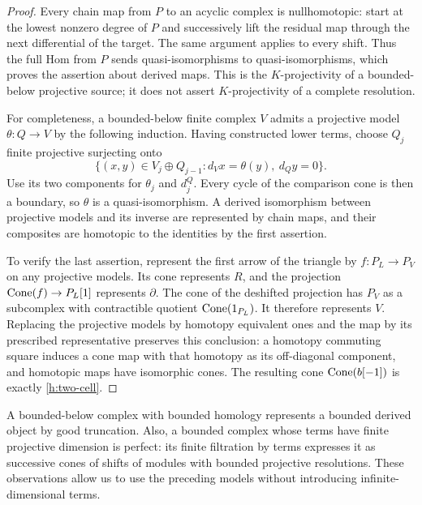 \begin{proof}
Every chain map from $P$ to an acyclic complex is nullhomotopic: start at
the lowest nonzero degree of $P$ and successively lift the residual map
through the next differential of the target. The same argument applies
to every shift. Thus the full Hom from $P$ sends quasi-isomorphisms to
quasi-isomorphisms, which proves the assertion about derived maps. This is
the $K$-projectivity of a bounded-below projective source; it does not assert
$K$-projectivity of a complete resolution.

For completeness, a bounded-below finite complex $V$ admits a projective
model $\theta:Q\to V$ by the following induction. Having constructed lower
terms, choose $Q_j$ finite projective surjecting onto
\[
 \{(x,y)\in V_j\oplus Q_{j-1}:d_Vx=\theta(y),\ d_Qy=0\}.
\]
Use its two components for $\theta_j$ and $d_j^Q$. Every cycle of the
comparison cone is then a boundary, so $\theta$ is a quasi-isomorphism.
A derived isomorphism between projective models and its inverse are
represented by chain maps, and their composites are homotopic to the
identities by the first assertion.

To verify the last assertion, represent the first arrow of the triangle
by $f:P_L\to P_V$ on any projective models. Its cone represents $R$, and
the projection $\operatorname{Cone}(f)\to P_L[1]$ represents $\partial$.
The cone of the deshifted projection has $P_V$ as a subcomplex with
contractible quotient $\operatorname{Cone}(1_{P_L})$. It therefore represents $V$.
Replacing the projective models by homotopy equivalent ones and the map
by its prescribed representative preserves this conclusion: a homotopy
commuting square induces a cone map with that homotopy as its off-diagonal
component, and homotopic maps have isomorphic cones. The resulting cone
$\operatorname{Cone}(b[-1])$ is exactly \eqref{h:two-cell}.
\end{proof}

A bounded-below complex with bounded homology represents a bounded derived
object by good truncation. Also, a bounded complex whose terms have finite
projective dimension is perfect: its finite filtration by terms expresses
it as successive cones of shifts of modules with bounded projective
resolutions. These observations allow us to use the preceding models
without introducing infinite-dimensional terms.


